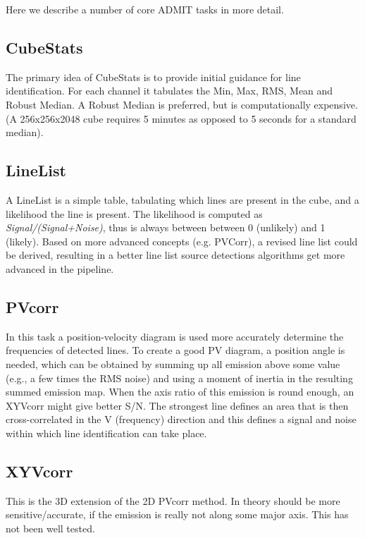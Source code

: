 \documentclass{article}
\begin{document}
Here we describe a number of core ADMIT tasks in more detail.

\subsection{CubeStats}

The primary idea of CubeStats is to provide initial guidance for line
identification. For each channel it tabulates the Min, Max, RMS, Mean
and Robust Median.  A Robust Median is preferred, but is computationally 
expensive. (A 256x256x2048 cube requires 5 minutes as opposed to 5 seconds
for a standard median).

\subsection{LineList}

A LineList is a simple table, tabulating which lines are present in the
cube, and a likelihood the line is present. The likelihood is computed as
{\it Signal/(Signal+Noise)}, thus is always between between 0 (unlikely)
and 1 (likely).  Based on more advanced concepts (e.g. PVCorr), a revised
line list could be derived, resulting in a better line list source
detections algorithms get more advanced in the pipeline.

\subsection{PVcorr}

In this task a position-velocity diagram is used more accurately
determine the frequencies of detected lines.  To create a good PV
diagram, a position angle is needed, which can be obtained by summing
up all emission above some value (e.g., a few times the RMS noise) and using
a moment of inertia in the resulting summed emission map.  When the axis
ratio of this emission is round enough, an XYVcorr might give better S/N.
The strongest line defines an area that is then cross-correlated in the V
(frequency) direction and this defines a signal and noise within which
line identification can take place.

\subsection{XYVcorr}

This is the 3D extension of the 2D PVcorr method. In theory should be
more sensitive/accurate, if the emission is really not along some
major axis. This has not been well tested.
\end{document}
